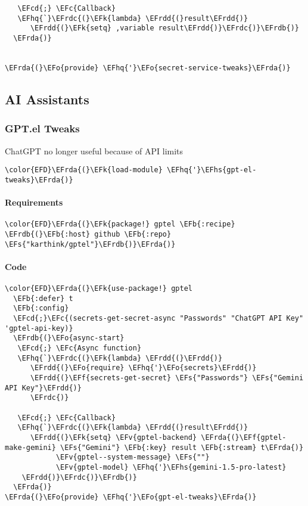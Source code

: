 \documentclass[a4wide,10pt]{article}
\newcommand{\EFc}[1]{\textcolor{EFc}{#1}} %
\newcommand{\EFcd}[1]{\textcolor{EFcd}{#1}} %
\newcommand{\EFs}[1]{\textcolor{EFs}{#1}} %
\newcommand{\EFk}[1]{\textcolor{EFk}{#1}} %
\newcommand{\EFb}[1]{\textcolor{EFb}{#1}} %
\newcommand{\EFf}[1]{\textcolor{EFf}{#1}} %
\newcommand{\EFv}[1]{\textcolor{EFv}{#1}} %
\newcommand{\EFo}[1]{\textcolor{EFo}{#1}} %
\newcommand{\EFhq}[1]{\textcolor{EFhq}{#1}} %
\newcommand{\EFhs}[1]{\textcolor{EFhs}{#1}} %
\newcommand{\EFrda}[1]{\textcolor{EFrda}{#1}} %
\newcommand{\EFrdb}[1]{\textcolor{EFrdb}{#1}} %
\newcommand{\EFrdc}[1]{\textcolor{EFrdc}{#1}} %
\newcommand{\EFrdd}[1]{\textcolor{EFrdd}{#1}} %
\begin{document}
\begin{Code}
\begin{Verbatim}
   \EFcd{;} \EFc{Callback}
   \EFhq{`}\EFrdc{(}\EFk{lambda} \EFrdd{(}result\EFrdd{)}
      \EFrdd{(}\EFk{setq} ,variable result\EFrdd{)}\EFrdc{)}\EFrdb{)}
  \EFrda{)}


\EFrda{(}\EFo{provide} \EFhq{'}\EFo{secret-service-tweaks}\EFrda{)}
\end{Verbatim}
\end{Code}
\subsection{AI Assistants}
\label{sec:org74b3bab}
\subsubsection{GPT.el Tweaks}
\label{sec:orgdf5ecab}
ChatGPT no longer useful because of API limits
\begin{Code}
\begin{Verbatim}
\color{EFD}\EFrda{(}\EFk{load-module} \EFhq{'}\EFhs{gpt-el-tweaks}\EFrda{)}
\end{Verbatim}
\end{Code}
\paragraph{Requirements}
\label{sec:org820e373}
\begin{Code}
\begin{Verbatim}
\color{EFD}\EFrda{(}\EFk{package!} gptel \EFb{:recipe} \EFrdb{(}\EFb{:host} github \EFb{:repo} \EFs{"karthink/gptel"}\EFrdb{)}\EFrda{)}
\end{Verbatim}
\end{Code}
\paragraph{Code}
\label{sec:org63881d7}
\begin{Code}
\begin{Verbatim}
\color{EFD}\EFrda{(}\EFk{use-package!} gptel
  \EFb{:defer} t
  \EFb{:config}
  \EFcd{;}\EFc{(secrets-get-secret-async "Passwords" "ChatGPT API Key" 'gptel-api-key)}
  \EFrdb{(}\EFo{async-start}
   \EFcd{;} \EFc{Async function}
   \EFhq{`}\EFrdc{(}\EFk{lambda} \EFrdd{(}\EFrdd{)}
      \EFrdd{(}\EFo{require} \EFhq{'}\EFo{secrets}\EFrdd{)}
      \EFrdd{(}\EFf{secrets-get-secret} \EFs{"Passwords"} \EFs{"Gemini API Key"}\EFrdd{)}
      \EFrdc{)}

   \EFcd{;} \EFc{Callback}
   \EFhq{`}\EFrdc{(}\EFk{lambda} \EFrdd{(}result\EFrdd{)}
      \EFrdd{(}\EFk{setq} \EFv{gptel-backend} \EFrda{(}\EFf{gptel-make-gemini} \EFs{"Gemini"} \EFb{:key} result \EFb{:stream} t\EFrda{)}
            \EFv{gptel--system-message} \EFs{""}
            \EFv{gptel-model} \EFhq{'}\EFhs{gemini-1.5-pro-latest}
    \EFrdd{)}\EFrdc{)}\EFrdb{)}
  \EFrda{)}
\EFrda{(}\EFo{provide} \EFhq{'}\EFo{gpt-el-tweaks}\EFrda{)}
\end{Verbatim}
\end{Code}
\end{document}
